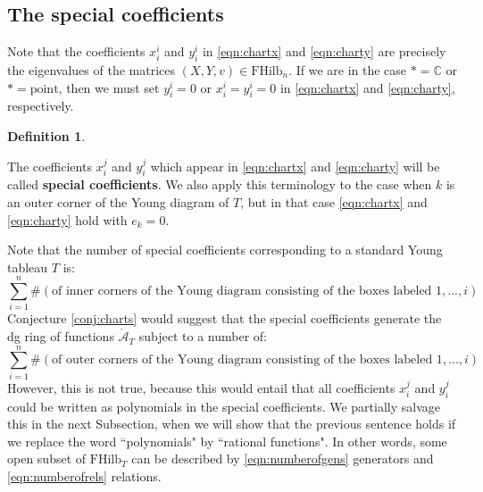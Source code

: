 \documentclass[12pt]{amsart}
\numberwithin{equation}{section}
\theoremstyle{definition}
\newtheorem{definition}[theorem]{Definition}
\theoremstyle{remark}
\newcommand{\CC}{\mathbb{C}}
\newcommand{\CA}{\mathcal{A}}
\renewcommand{\1}{\mathbf{1}}
\newcommand{\FH}{\mathrm{FHilb}}
\newcommand{\point}{\mathrm{point}}
\newcommand{\oCA}{\mathring{\CA}}
\begin{document}
\subsection{The special coefficients}
\label{sub:special}

Note that the coefficients $x_i^i$ and $y_i^i$ in \eqref{eqn:chartx} and \eqref{eqn:charty} are precisely the eigenvalues of the matrices $(X,Y,v) \in \FH_n$. If we are in the case $* = \CC$ or $* = \point$, then we must set $y_i^i = 0$ or $x_i^i = y_i^i = 0$ in \eqref{eqn:chartx} and \eqref{eqn:charty}, respectively.

\begin{definition}
\label{def:specialcoeffs}

The coefficients $x_i^j$ and $y_i^j$ which appear in \eqref{eqn:chartx} and \eqref{eqn:charty} will be called \textbf{special coefficients}. We also apply this terminology to the case when $k$ is an outer corner of the Young diagram of $T$, but in that case \eqref{eqn:chartx} and \eqref{eqn:charty} hold with $e_k = 0$. 

\end{definition}

Note that the number of special coefficients corresponding to a standard Young tableau $T$ is:
\begin{equation}
\label{eqn:numberofgens}
\sum_{i=1}^n \# \left( \text{of inner corners of the Young diagram consisting of the boxes labeled } 1,...,i \right)
\end{equation}
Conjecture \ref{conj:charts} would suggest that the special coefficients generate the dg ring of functions $\oCA_T$ subject to a number of: 
\begin{equation}
\label{eqn:numberofrels}
\sum_{i=1}^n \# \left( \text{of outer corners of the Young diagram consisting of the boxes labeled } 1,...,i \right)
\end{equation}
However, this is not true, because this would entail that all coefficients $x_i^j$ and $y_i^j$ could be written as polynomials in the special coefficients. We partially salvage this in the next Subsection, when we will show that the previous sentence holds if we replace the word ``polynomials" by ``rational functions". In other words, some open subset of $\FH_T$ can be described by \eqref{eqn:numberofgens} generators and \eqref{eqn:numberofrels} relations.
\end{document}
